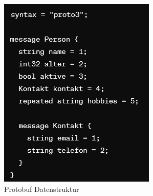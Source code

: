 \begin{figure}[h]
	\centering
	\begin{minipage}{0.35\textwidth}
		\centering
		\includegraphics[width=\textwidth]{figures/protobufexample.png}
		\caption{Protobuf Datenstruktur}
		\label{fig:protobuf}
	\end{minipage}\hfill
	\begin{minipage}{0.35\textwidth}
		\centering

\end{minipage}
\end{figure}
